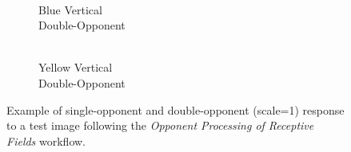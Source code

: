 \documentclass[journal,onecolumn]{IEEEtran}
\begin{document}
\begin{figure}[h]
\begin{subfigure}{0.15\textwidth}
        \caption{\\ Blue Vertical\\ Double-Opponent}
    \end{subfigure}
    \begin{subfigure}{0.15\textwidth}
        \centering
        \captionsetup{justification=centering}
        \caption{\\ Yellow Vertical\\ Double-Opponent}
    \end{subfigure}%
    \caption{Example of single-opponent and double-opponent (scale=1) response to a test image following the \textit{Opponent Processing of Receptive Fields} workflow.}
    \label{fig:blur-effect}
\end{figure}
\end{document}
